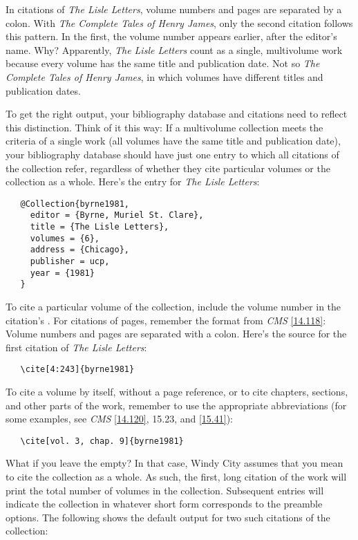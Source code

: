 \documentclass[11pt,letterpaper,oneside]{article}
\begin{document}
In citations of \textit{The Lisle Letters}, volume numbers and pages
are separated by a colon. With \textit{The Complete Tales of Henry
James}, only the second citation follows this pattern. In the first,
the volume number appears earlier, after the editor's name. Why?
Apparently, \textit{The Lisle Letters} count as a single, multivolume
work because every volume has the same title and publication date. Not
so \textit{The Complete Tales of Henry James}, in which volumes have
different titles and publication dates.

To get the right output, your bibliography database and citations need
to reflect this distinction. Think of it this way: If a multivolume
collection meets the criteria of a single work (all volumes have the
same title and publication date), your bibliography database should
have just one entry to which all citations of the collection refer,
regardless of whether they cite particular volumes or the collection
as a whole. Here's the entry for \textit{The Lisle Letters}:

\begin{verbatim}
   @Collection{byrne1981,
     editor = {Byrne, Muriel St. Clare},
     title = {The Lisle Letters},
     volumes = {6},
     address = {Chicago},
     publisher = ucp,
     year = {1981}
   }
\end{verbatim}

To cite a particular volume of the collection, include the volume
number in the citation's . For citations of pages,
remember the format from \textit{CMS} \ref{14.118}: Volume numbers and
pages are separated with a colon. Here's the source for the first
citation of \textit{The Lisle Letters}:

\begin{verbatim}
   \cite[4:243]{byrne1981}
\end{verbatim}

\noindent To cite a volume by itself, without a page reference, or to
cite chapters, sections, and other parts of the work, remember to use
the appropriate abbreviations (for some examples, see \textit{CMS}
\ref{14.120}, 15.23, and \ref{15.41}):

\begin{verbatim}
   \cite[vol. 3, chap. 9]{byrne1981}
\end{verbatim}

What if you leave the  empty? In that case, Windy
City assumes that you mean to cite the collection as a whole. As such,
the first, long citation of the work will print the total number of
volumes in the collection. Subsequent entries will indicate the
collection in whatever short form corresponds to the preamble options.
The following shows the default output for two such citations of the
collection:
\end{document}
